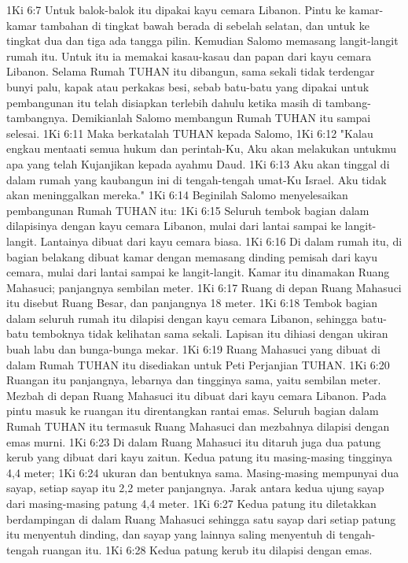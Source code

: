 1Ki 6:7  Untuk balok-balok itu dipakai kayu cemara Libanon. Pintu ke kamar-kamar tambahan di tingkat bawah berada di sebelah selatan, dan untuk ke tingkat dua dan tiga ada tangga pilin. Kemudian Salomo memasang langit-langit rumah itu. Untuk itu ia memakai kasau-kasau dan papan dari kayu cemara Libanon. Selama Rumah TUHAN itu dibangun, sama sekali tidak terdengar bunyi palu, kapak atau perkakas besi, sebab batu-batu yang dipakai untuk pembangunan itu telah disiapkan terlebih dahulu ketika masih di tambang-tambangnya. Demikianlah Salomo membangun Rumah TUHAN itu sampai selesai.
1Ki 6:11  Maka berkatalah TUHAN kepada Salomo,
1Ki 6:12  "Kalau engkau mentaati semua hukum dan perintah-Ku, Aku akan melakukan untukmu apa yang telah Kujanjikan kepada ayahmu Daud.
1Ki 6:13  Aku akan tinggal di dalam rumah yang kaubangun ini di tengah-tengah umat-Ku Israel. Aku tidak akan meninggalkan mereka."
1Ki 6:14  Beginilah Salomo menyelesaikan pembangunan Rumah TUHAN itu:
1Ki 6:15  Seluruh tembok bagian dalam dilapisinya dengan kayu cemara Libanon, mulai dari lantai sampai ke langit-langit. Lantainya dibuat dari kayu cemara biasa.
1Ki 6:16  Di dalam rumah itu, di bagian belakang dibuat kamar dengan memasang dinding pemisah dari kayu cemara, mulai dari lantai sampai ke langit-langit. Kamar itu dinamakan Ruang Mahasuci; panjangnya sembilan meter.
1Ki 6:17  Ruang di depan Ruang Mahasuci itu disebut Ruang Besar, dan panjangnya 18 meter.
1Ki 6:18  Tembok bagian dalam seluruh rumah itu dilapisi dengan kayu cemara Libanon, sehingga batu-batu temboknya tidak kelihatan sama sekali. Lapisan itu dihiasi dengan ukiran buah labu dan bunga-bunga mekar.
1Ki 6:19  Ruang Mahasuci yang dibuat di dalam Rumah TUHAN itu disediakan untuk Peti Perjanjian TUHAN.
1Ki 6:20  Ruangan itu panjangnya, lebarnya dan tingginya sama, yaitu sembilan meter. Mezbah di depan Ruang Mahasuci itu dibuat dari kayu cemara Libanon. Pada pintu masuk ke ruangan itu direntangkan rantai emas. Seluruh bagian dalam Rumah TUHAN itu termasuk Ruang Mahasuci dan mezbahnya dilapisi dengan emas murni.
1Ki 6:23  Di dalam Ruang Mahasuci itu ditaruh juga dua patung kerub yang dibuat dari kayu zaitun. Kedua patung itu masing-masing tingginya 4,4 meter;
1Ki 6:24  ukuran dan bentuknya sama. Masing-masing mempunyai dua sayap, setiap sayap itu 2,2 meter panjangnya. Jarak antara kedua ujung sayap dari masing-masing patung 4,4 meter.
1Ki 6:27  Kedua patung itu diletakkan berdampingan di dalam Ruang Mahasuci sehingga satu sayap dari setiap patung itu menyentuh dinding, dan sayap yang lainnya saling menyentuh di tengah-tengah ruangan itu.
1Ki 6:28  Kedua patung kerub itu dilapisi dengan emas.
